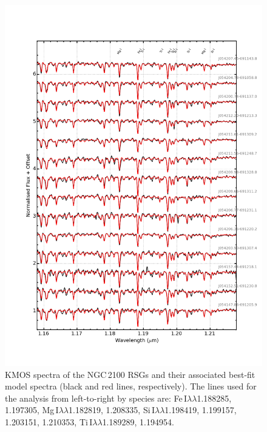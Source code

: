 \documentclass[useAMS,usenatbib]{mn2e}
\begin{document}
\begin{figure}
 \begin{center}
\includegraphics[width=16cm]{NGC2100-model-fits}
\caption{KMOS spectra of the NGC\,2100 RSGs and their associated best-fit model spectra
(black and red lines, respectively).
The lines used for the analysis from left-to-right by species are:
Fe\,I$\lambda\lambda$1.188285,
1.197305,
Mg\,I$\lambda\lambda$1.182819,
1.208335,
Si\,I$\lambda\lambda$1.198419,
1.199157,
1.203151,
1.210353,
Ti\,I$\lambda\lambda$1.189289,
1.194954.
         }
\label{fig:model_fits}
\end{center}
\end{figure}




\end{document}
